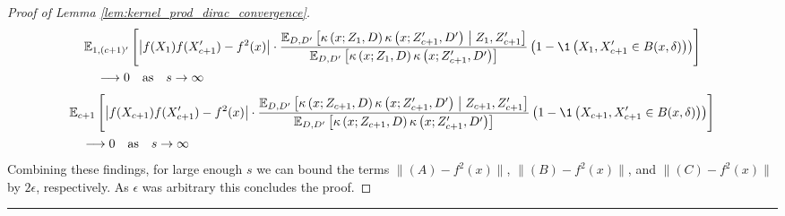 \begin{proof}[Proof of Lemma \ref{lem:kernel_prod_dirac_convergence}]
\begin{equation}
    \end{equation}
    \begin{equation}
        \begin{aligned}
            & \E_{1, (c+1)^{\prime}}\left[
                \left| f(X_{1}) f(X_{c+1}^{\prime}) - f^{2}(x)\right|
                \cdot \frac{\E_{D, D^{\prime}}\left[\kappa\left(x; Z_{1}, D\right)\kappa\left(x; Z_{c+1}^{\prime}, D^{\prime}\right) \; \middle| \; Z_{1}, Z_{c+1}^{\prime}\right]}{\E_{D, D^{\prime}}\left[\kappa\left(x; Z_{1}, D\right)\kappa\left(x; Z_{c+1}^{\prime}, D^{\prime}\right)\right]}
                \left(1 - \1\left(X_1, X_{c+1}^{\prime} \in B(x, \delta)\right)\right)
            \right]\\
            & \quad \longrightarrow 0 \quad \text{as} \quad s \rightarrow \infty
        \end{aligned}
    \end{equation}
    \begin{equation}
        \begin{aligned}
            & \E_{c+1}\left[
                \left|f(X_{c+1}) f(X_{c+1}^{\prime}) - f^{2}(x)\right|
                \cdot \frac{\E_{D, D^{\prime}}\left[\kappa\left(x; Z_{c+1}, D\right)\kappa\left(x; Z_{c+1}^{\prime}, D^{\prime}\right) \; \middle| \; Z_{c+1}, Z_{c+1}^{\prime}\right]}{\E_{D, D^{\prime}}\left[\kappa\left(x; Z_{c+1}, D\right)\kappa\left(x; Z_{c+1}^{\prime}, D^{\prime}\right)\right]} 
                \left(1 - \1\left(X_{c+1}, X_{c+1}^{\prime} \in B(x, \delta)\right)\right)
            \right]\\
            & \quad \longrightarrow 0 \quad \text{as} \quad s \rightarrow \infty
        \end{aligned}
    \end{equation}
    Combining these findings, for large enough $s$ we can bound the terms $\|(A) - f^{2}(x)\|$, $\|(B) - f^{2}(x)\|$, and $\|(C) - f^{2}(x)\|$ by $2\epsilon$, respectively.
    As $\epsilon$ was arbitrary this concludes the proof.
\end{proof}

\hrule
